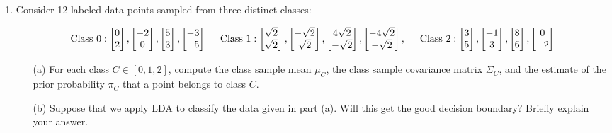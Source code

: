 \documentclass[10pt]{article}
\begin{document}
\begin{enumerate}[1.]
		\item  Consider 12 labeled data points sampled from three distinct classes:\\
        \begin{scriptsize}
        \begin{equation*}
\text{Class 0}: 
\begin{bmatrix}
0\\
2
\end{bmatrix},\begin{bmatrix}
-2\\
0
\end{bmatrix},
\begin{bmatrix}
5\\
3
\end{bmatrix},
\begin{bmatrix}
-3\\
-5
\end{bmatrix}
 \hspace{0.5cm}\text{Class 1}: 
\begin{bmatrix}
\sqrt{2}\\
\sqrt{2}
\end{bmatrix},\begin{bmatrix}
-\sqrt{2}\\
\sqrt{2}
\end{bmatrix},
\begin{bmatrix}
4\sqrt{2}\\
-\sqrt{2}
\end{bmatrix},
\begin{bmatrix}
-4\sqrt{2}\\
-\sqrt{2}
\end{bmatrix}, \hspace{0.5cm}\text{Class 2}: 
\begin{bmatrix}
3\\
5
\end{bmatrix},\begin{bmatrix}
-1\\
3
\end{bmatrix},
\begin{bmatrix}
8\\
6
\end{bmatrix},
\begin{bmatrix}
0\\
-2
\end{bmatrix}
\end{equation*} 
\end{scriptsize}
		\begin{itemize}
			\item[(a)] For each class $C \in [0, 1, 2]$, compute the class sample mean $\mu_C$, the class sample covariance matrix $\Sigma_C$, and the estimate
of the prior probability $\pi_C$ that a point belongs to class $C$. ~
			\item[(b)] Suppose that we apply LDA to classify the data given in part (a). Will this get the good decision boundary? Briefly explain your answer.~
		\end{itemize}
               

\end{enumerate}
\end{document}
